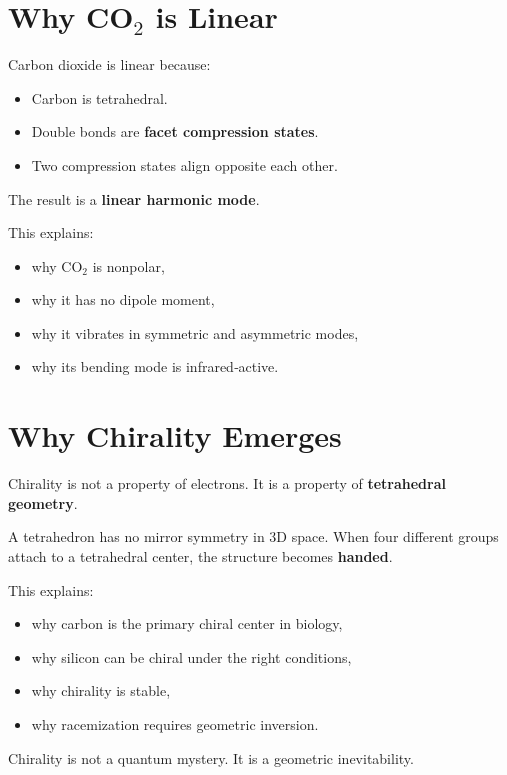 \documentclass[11pt, letterpaper, openany]{book}
\begin{document}
\section{Why CO$_2$ is Linear}

Carbon dioxide is linear because:

\begin{itemize}
    \item Carbon is tetrahedral.
    \item Double bonds are \textbf{facet compression states}.
    \item Two compression states align opposite each other.
\end{itemize}

The result is a \textbf{linear harmonic mode}.

This explains:

\begin{itemize}
    \item why CO$_2$ is nonpolar,
    \item why it has no dipole moment,
    \item why it vibrates in symmetric and asymmetric modes,
    \item why its bending mode is infrared‑active.
\end{itemize}

\section{Why Chirality Emerges}

Chirality is not a property of electrons. It is a property of \textbf{tetrahedral geometry}.

A tetrahedron has no mirror symmetry in 3D space. When four different groups attach to a
tetrahedral center, the structure becomes \textbf{handed}.

This explains:

\begin{itemize}
    \item why carbon is the primary chiral center in biology,
    \item why silicon can be chiral under the right conditions,
    \item why chirality is stable,
    \item why racemization requires geometric inversion.
\end{itemize}

Chirality is not a quantum mystery. It is a geometric inevitability.
\end{document}
